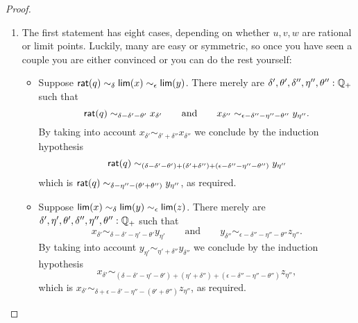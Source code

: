 \begin{proof}
  \mbox{}
  \begin{enumerate}
  \item The first statement has eight cases, depending on whether $u, v, w$ are rational
    or limit points. Luckily, many are easy or symmetric, so once you have seen a couple
    you are either convinced or you can do the rest yourself:
    \begin{itemize}
    \item Suppose $\mathsf{rat}(q) \sim_\delta \mathsf{lim}(x) \sim_\epsilon \mathsf{lim}(y)$. There merely are
      $\delta', \theta', \delta'', \eta'', \theta'' : \mathbb{Q}_{+}$ such that
      \begin{equation*}
        \mathsf{rat}(q)
        \sim_{\delta - \delta' - \theta'}
        x_{\delta'}
        \qquad\text{and}\qquad
        x_{\delta''}
        \sim_{\epsilon - \delta'' - \eta'' - \theta''}
        y_{\eta''}.
      \end{equation*}
      By taking into account $x_{\delta'} \sim_{\delta' + \delta''} x_{\delta''}$ we
      conclude by the induction hypothesis
      \begin{equation*}
        \mathsf{rat}(q) \sim_{(\delta - \delta' - \theta') + (\delta' + \delta'') + (\epsilon -
          \delta'' - \eta'' - \theta'')} y_{\eta''}
      \end{equation*}
      which is $\mathsf{rat}(q) \sim_{\delta - \eta'' - (\theta' + \theta'')} y_{\eta''}$, as required.
    \item Suppose $\mathsf{lim}(x) \sim_\delta \mathsf{lim}(y) \sim_\epsilon \mathsf{lim}(z)$. There merely are
      $\delta', \eta', \theta', \delta'', \eta'', \theta'' : \mathbb{Q}_{+}$ such that
      \begin{equation*}
        x_{\delta'} \sim_{\delta - \delta' - \eta' - \theta'} y_{\eta'}
        \qquad\text{and}\qquad
        y_{\delta''} \sim_{\epsilon - \delta'' - \eta'' - \theta''} z_{\eta''}.
      \end{equation*}
      By taking into account $y_{\eta'} \sim_{\eta' + \delta''} y_{\delta''}$ we conclude
      by the induction hypothesis
      \begin{equation*}
        x_{\delta'} \sim_{(\delta - \delta' - \eta' - \theta') + (\eta' + \delta'') +
          (\epsilon - \delta'' - \eta'' - \theta'')} z_{\eta''},
      \end{equation*}
      which is $x_{\delta'} \sim_{\delta + \epsilon - \delta' - \eta'' - (\theta' +
        \theta'')} z_{\eta''}$, as required.      

\end{itemize}
\end{enumerate}
\end{proof}
